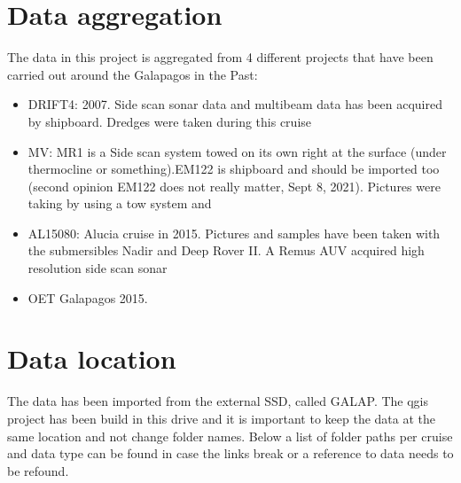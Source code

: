 \documentclass[letterpaper,10pt,english]{sphinxmanual}
\begin{document}
\section{Data aggregation}
\label{\detokenize{02_folder_hierarchy:data-aggregation}}
\sphinxAtStartPar
The data in this project is aggregated from 4 different projects that have been carried out around the Galapagos in the Past:
\begin{itemize}
\item {} 
\sphinxAtStartPar
DRIFT4: 2007. Side scan sonar data and multibeam data has been acquired by shipboard. Dredges were taken during this cruise

\item {} 
\sphinxAtStartPar
MV: MR1 is a Side scan system towed on its own right at the surface (under thermocline or something).EM122 is shipboard and should be imported too (second opinion EM122 does not really matter, Sept 8, 2021). Pictures were taking by using a tow system and

\item {} 
\sphinxAtStartPar
AL15080: Alucia cruise in 2015. Pictures and samples have been taken with the submersibles Nadir and Deep Rover II. A Remus AUV acquired high resolution side scan sonar

\item {} 
\sphinxAtStartPar
OET Galapagos 2015.

\end{itemize}


\section{Data location}
\label{\detokenize{02_folder_hierarchy:data-location}}
\sphinxAtStartPar
The data has been imported from the external SSD, called GALAP. The qgis project has been build in this drive and it is important to keep the data at the same location and not change folder names. Below a list of folder paths per cruise and data type can be found in case the links break or a reference to data needs to be refound.
\end{document}
